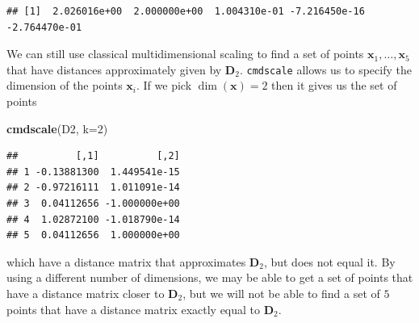 \documentclass[
]{book}
\newenvironment{Shaded}{\begin{snugshade}}{\end{snugshade}}
\newcommand{\AttributeTok}[1]{\textcolor[rgb]{0.13,0.29,0.53}{#1}}
\newcommand{\DecValTok}[1]{\textcolor[rgb]{0.00,0.00,0.81}{#1}}
\newcommand{\FloatTok}[1]{\textcolor[rgb]{0.00,0.00,0.81}{#1}}
\newcommand{\FunctionTok}[1]{\textcolor[rgb]{0.13,0.29,0.53}{\textbf{#1}}}
\newcommand{\NormalTok}[1]{#1}
\newcommand{\OtherTok}[1]{\textcolor[rgb]{0.56,0.35,0.01}{#1}}
\newcommand{\SpecialCharTok}[1]{\textcolor[rgb]{0.81,0.36,0.00}{\textbf{#1}}}
\theoremstyle{definition}
\theoremstyle{definition}
\theoremstyle{definition}
\theoremstyle{definition}
\theoremstyle{remark}
\begin{document}
\begin{Shaded}
\end{Shaded}

\begin{verbatim}
## [1]  2.026016e+00  2.000000e+00  1.004310e-01 -7.216450e-16 -2.764470e-01
\end{verbatim}

We can still use classical multidimensional scaling to find a set of points \(\mathbf x_1, \ldots, \mathbf x_5\) that have distances approximately given by \(\mathbf D_2\).
\texttt{cmdscale} allows us to specify the dimension of the points \(\mathbf x_i\). If we pick \(\dim(\mathbf x)=2\) then it gives us the set of points

\begin{Shaded}
\begin{Highlighting}[]
\FunctionTok{cmdscale}\NormalTok{(D2, }\AttributeTok{k=}\DecValTok{2}\NormalTok{)}
\end{Highlighting}
\end{Shaded}

\begin{verbatim}
##          [,1]          [,2]
## 1 -0.13881300  1.449541e-15
## 2 -0.97216111  1.011091e-14
## 3  0.04112656 -1.000000e+00
## 4  1.02872100 -1.018790e-14
## 5  0.04112656  1.000000e+00
\end{verbatim}

which have a distance matrix that approximates \(\mathbf D_2\), but does not equal it. By using a different number of dimensions, we may be able to get a set of points that have a distance matrix closer to \(\mathbf D_2\), but we will not be able to find a set of \(5\) points that have a distance matrix exactly equal to \(\mathbf D_2\).
\end{document}
